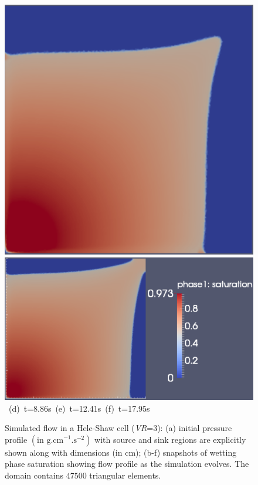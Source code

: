 \begin{landscape}
\begin{figure}[ht]
{{      \includegraphics[width=.375\textwidth]{./Pics1/Saffman_homogeneous_MR3/saffman_homo_fixed_3500.pdf} 
      \includegraphics[width=.65\textwidth]{./Pics1/Saffman_homogeneous_MR3/saffman_homo_fixed_end.pdf}}
\vspace{0.cm}
\hbox{ \hspace{1.cm} (d) t=8.86s \hspace{3.0cm} (e) t=12.41s   \hspace{4.0cm} (f) t=17.95s}
\vspace{0.cm}
}   
\caption{Simulated flow in a Hele-Shaw cell ({\it VR}=3): (a) initial pressure profile $\left(\text{in g.cm}^{-1}\text{.s}^{-2}\right)$ with source and sink regions are explicitly shown along with dimensions (in cm); (b-f) snapshots of wetting phase saturation showing flow profile as the simulation evolves. The domain contains $47500$  triangular elements.}
\label{fig:homoheleshaw_VN3}
\end{figure}
\end{landscape}
\clearpage



